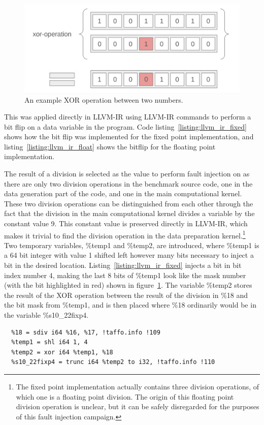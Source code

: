 \begin{figure}[h!]
    \centering
    \includegraphics[width=0.5\linewidth]{Images/xor_operation.png}
    \caption{An example XOR operation between two numbers.}
    \label{fig:xor_operation}
\end{figure}

This was applied directly in LLVM-IR using LLVM-IR commands to perform a bit flip on a data variable in the program. Code listing~\ref{listing:llvm_ir_fixed} shows how the bit flip was implemented for the fixed point implementation, and listing~\ref{listing:llvm_ir_float} shows the bitflip for the floating point implementation.



The result of a division is selected as the value to perform fault injection on as there are only two division operations in the benchmark source code, one in the data generation part of the code, and one in the main computational kernel. These two division operations can be distinguished from each other through the fact that the division in the main computational kernel divides a variable by the constant value 9. This constant value is preserved directly in LLVM-IR, which makes it trivial to find the division operation in the data preparation kernel.\footnote{The fixed point implementation actually contains three division operations, of which one is a floating point division. The origin of this floating point division operation is unclear, but it can be safely disregarded for the purposes of this fault injection campaign.}
Two temporary variables, \%temp1 and \%temp2, are introduced, where \%temp1 is a 64 bit integer with value 1 shifted left however many bits necessary to inject a bit in the desired location. Listing~\ref{listing:llvm_ir_fixed} injects a bit in bit index number 4, making the last 8 bits of \%temp1 look like the mask number (with the bit highlighted in red) shown in figure~\ref{fig:xor_operation}.
The variable \%temp2 stores the result of the XOR operation between the result of the division in \%18 and the bit mask from \%temp1, and is then placed where \%18 ordinarily would be in the variable \%s10\_22fixp4.

\begin{lstlisting}[caption=fixed point bit flip in llvm-ir, label=listing:llvm_ir_fixed]
  %17 = sext i32 %0 to i64, !taffo.info !45
  %18 = sdiv i64 %16, %17, !taffo.info !109
  %temp1 = shl i64 1, 4
  %temp2 = xor i64 %temp1, %18
  %s10_22fixp4 = trunc i64 %temp2 to i32, !taffo.info !110
\end{lstlisting} 

